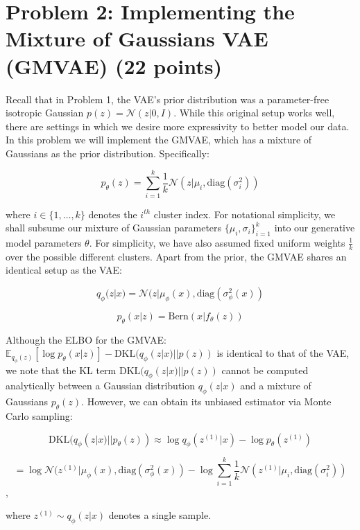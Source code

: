 \documentclass{article}
\theoremstyle{case}
\theoremstyle{definition}
\begin{document}
\newpage
\section*{Problem 2: Implementing the Mixture of Gaussians VAE (GMVAE) (22 points)}

Recall that in Problem 1, the VAE's prior distribution was a parameter-free isotropic Gaussian $p(z) = \mathcal{N}(z|0, I)$. While this original setup works well, there are settings in which we desire more expressivity to better model our data. In this problem we will implement the GMVAE, which has a mixture of Gaussians as the prior distribution. Specifically:

\[
p_{\theta}(z) = \sum_{i=1}^{k} \frac{1}{k} \mathcal{N}(z|\mu_i, \text{diag}(\sigma^2_i))
\]

where $i \in \{1, \dots, k\}$ denotes the $i^{th}$ cluster index. For notational simplicity, we shall subsume our mixture of Gaussian parameters $\{\mu_i, \sigma_i\}_{i=1}^k$ into our generative model parameters $\theta$. For simplicity, we have also assumed fixed uniform weights $\frac{1}{k}$ over the possible different clusters. Apart from the prior, the GMVAE shares an identical setup as the VAE:

\[
q_{\phi}(z|x) = \mathcal{N}(z|\mu_{\phi}(x), \text{diag}(\sigma^2_{\phi}(x))
\]

\[
p_{\theta}(x|z) = \text{Bern}(x|f_{\theta}(z))
\]

Although the ELBO for the GMVAE: $\mathbb{E}_{q_{\phi}(z)}[\log p_{\theta}(x|z)] - \text{DKL}(q_{\phi}(z|x)||p(z))$ is identical to that of the VAE, we note that the KL term $\text{DKL}(q_{\phi}(z|x)||p(z))$ cannot be computed analytically between a Gaussian distribution $q_{\phi}(z|x)$ and a mixture of Gaussians $p_{\theta}(z)$. However, we can obtain its unbiased estimator via Monte Carlo sampling:

\[
\text{DKL}(q_{\phi}(z|x)||p_\theta(z)) \approx \log q_{\phi}(z^{(1)}|x) - \log p_{\theta}(z^{(1)})
\]

\[
= \log \mathcal{N}(z^{(1)}|\mu_{\phi}(x), \text{diag}(\sigma^2_{\phi}(x)) - \log \sum_{i=1}^{k} \frac{1}{k} \mathcal{N}(z^{(1)}|\mu_i, \text{diag}(\sigma^2_i))
\],

where $z^{(1)} \sim q_{\phi}(z|x)$ denotes a single sample.
\end{document}

